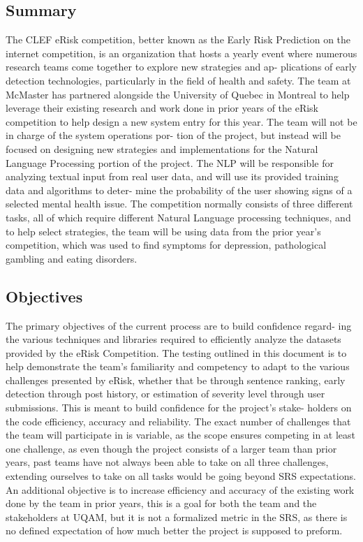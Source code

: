 \documentclass[12pt, titlepage]{article}
\begin{document}
\subsection{Summary}

The CLEF eRisk competition, better known as the Early Risk Prediction on
the internet competition, is an organization that hosts a yearly event where
numerous research teams come together to explore new strategies and ap-
plications of early detection technologies, particularly in the field of health
and safety. The team at McMaster has partnered alongside the University of
Quebec in Montreal to help leverage their existing research and work done
in prior years of the eRisk competition to help design a new system entry
for this year. The team will not be in charge of the system operations por-
tion of the project, but instead will be focused on designing new strategies
and implementations for the Natural Language Processing portion of the
project. The NLP will be responsible for analyzing textual input from real
user data, and will use its provided training data and algorithms to deter-
mine the probability of the user showing signs of a selected mental health
issue. The competition normally consists of three different tasks, all of which
require different Natural Language processing techniques, and to help select
strategies, the team will be using data from the prior year's competition, which was used
to find symptoms for depression, pathological gambling and eating disorders.

\subsection{Objectives}

The primary objectives of the current process are to build confidence regard-
ing the various techniques and libraries required to efficiently analyze the
datasets provided by the eRisk Competition. The testing outlined in this
document is to help demonstrate the team's familiarity and competency to adapt to
the various challenges presented by eRisk, whether that be through sentence
ranking, early detection through post history, or estimation of severity level
through user submissions. This is meant to build confidence for the project's stake-
holders on the code efficiency, accuracy and reliability. The exact number of
challenges that the team will participate in is variable, as the scope ensures
competing in at least one challenge, as even though the project consists of a larger team than prior years, past teams have not always been able to take on
all three challenges, extending ourselves to take on all tasks would be going
beyond SRS expectations. An additional objective is to increase efficiency
and accuracy of the existing work done by the team in prior years, this is
a goal for both the team and the stakeholders at UQAM, but it is not a
formalized metric in the SRS, as there is no defined expectation of how much
better the project is supposed to preform.
\end{document}
